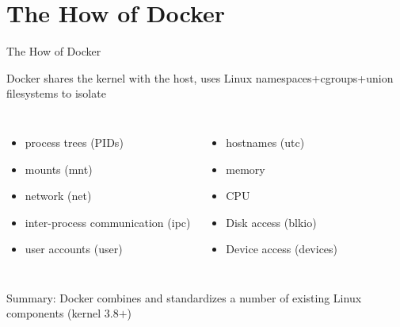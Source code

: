 \documentclass[xcolor=dvipsnames]{beamer}
\newcommand{\cpause}{}
\begin{document}
\section{The How of Docker}
\begin{frame}{The How of Docker}

Docker shares the kernel with the host, uses Linux namespaces+cgroups+union filesystems to isolate
  \begin{columns}
    \begin{itemize}
    \item process trees (PIDs) \cpause
    \item mounts (mnt) \cpause
    \item network  (net) \cpause
    \item inter-process communication (ipc) \cpause
    \item user accounts (user) \cpause
    \end{itemize}
    \begin{itemize}
    \item hostnames (utc) \cpause
    \item memory \cpause
    \item CPU \cpause
    \item Disk access (blkio) \cpause
    \item Device access (devices) \cpause
    \end{itemize}
  \end{columns}
  \cpause

  \vspace{8mm}
  Summary: Docker combines and standardizes a number of existing Linux components (kernel 3.8$+$)

\end{frame}
  
\end{document}
